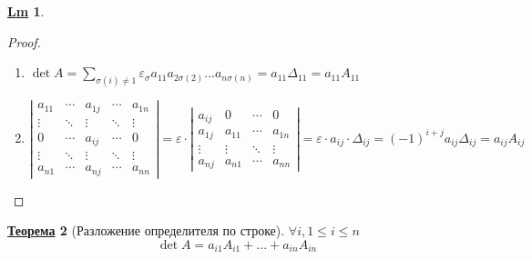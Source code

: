 \documentclass[12pt]{article}
\newenvironment{MyList}[1][4pt]{
  \begin{enumerate}[1.]
  \setlength{\parskip}{0pt}
  \setlength{\itemsep}{#1}
}{       
  \end{enumerate}
}
\theoremstyle{definition} %
\newtheorem{Thm}{\underline{Теорема}}[subsection] %
\newtheorem{Lm}[Thm]{\underline{Lm}} %
\theoremstyle{plain} %
\theoremstyle{remark} %
\begin{document}
{\begin{Lm}
    \begin{proof}
        \begin{MyList}
            \item $\det A = \sum_{\sigma(i) \neq 1} \varepsilon_\sigma a_{11} a_{2 \sigma(2)} ... a_{n \sigma(n)} = a_{11} \Delta_{11} = a_{11} A_{11}$ 
            \item $\left|\begin{array}{ccccc}
            a_{11} & \cdots & a_{1j} & \cdots & a_{1n} \\ 
            \vdots & \ddots & \vdots & \ddots & \vdots \\ 
            0 & \cdots & a_{ij} & \cdots & 0 \\ 
            \vdots & \ddots & \vdots & \ddots & \vdots \\ 
            a_{n1} & \cdots & a_{nj} & \cdots & a_{nn}
            \end{array}\right| = \varepsilon \cdot \left|\begin{array}{cccc}
            a_{ij} & 0 & \cdots & 0 \\ 
            a_{1j} & a_{11} & \cdots & a_{1n} \\ 
            \vdots & \vdots & \ddots & \vdots \\ 
            a_{nj} & a_{n1} & \cdots & a_{nn}
            \end{array}\right| = \varepsilon \cdot a_{ij} \cdot \Delta_{ij} = (-1)^{i + j}a_{ij} \Delta_{ij} = a_{ij} A_{ij}$ 
        \end{MyList}
    \end{proof}
\end{Lm}

\begin{Thm}[Разложение определителя по строке]
    $\forall i, 1 \leqslant i \leqslant n$
    \[\det A = a_{i1} A_{i1} + ... + a_{in} A_{in}\] 
\end{Thm}

}
\end{document}
